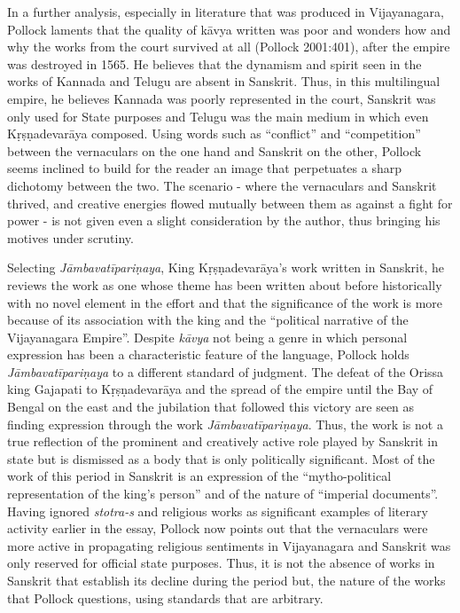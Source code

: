 In a further analysis, especially in literature that was produced in Vijayanagara, Pollock laments that the quality of kāvya written was poor and wonders how and why the works from the court survived at all (Pollock 2001:401), after the empire was destroyed in 1565. He believes that the dynamism and spirit seen in the works of Kannada and Telugu are absent in Sanskrit. Thus, in this multilingual empire, he believes Kannada was poorly represented in the court, Sanskrit was only used for State purposes and Telugu was the main medium in which even Kṛṣṇadevarāya composed. Using words such as “conflict” and “competition” between the vernaculars on the one hand and Sanskrit on the other, Pollock seems inclined to build for the reader an image that perpetuates a sharp dichotomy between the two. The scenario - where the vernaculars and Sanskrit thrived, and creative energies flowed mutually between them as against a fight for power - is not given even a slight consideration by the author, thus bringing his motives under scrutiny. 

Selecting {\sl Jāmbavatīpariṇaya}, King Kṛṣṇadevarāya’s work written in Sanskrit, he reviews the work as one whose theme has been written about before historically with no novel element in the effort and that the significance of the work is more because of its association with the king and the “political narrative of the Vijayanagara Empire”. Despite {\sl kāvya} not being a genre in which personal expression has been a characteristic feature of the language, Pollock holds {\sl Jāmbavatīpariṇaya} to a different standard of judgment. The defeat of the Orissa king Gajapati to Kṛṣṇadevarāya and the spread of the empire until the Bay of Bengal on the east and the jubilation that followed this victory are seen as finding expression through the work {\sl Jāmbavatīpariṇaya}. Thus, the work is not a true reflection of the prominent and creatively active role played by Sanskrit in state but is dismissed as a body that is only politically significant. Most of the work of this period in Sanskrit is an expression of the “mytho-political representation of the king’s person” and of the nature of “imperial documents”. Having ignored {\sl stotra-s} and religious works as significant examples of literary activity earlier in the essay, Pollock now points out that the vernaculars were more active in propagating religious sentiments in Vijayanagara and Sanskrit was only reserved for official state purposes. Thus, it is not the absence of works in Sanskrit that establish its decline during the period but, the nature of the works that Pollock questions, using standards that are arbitrary.

